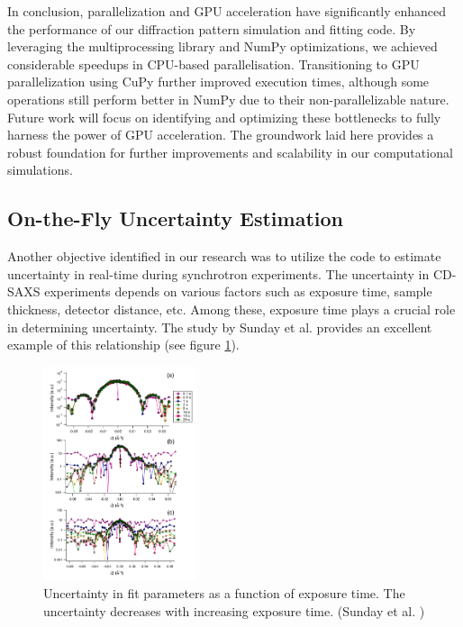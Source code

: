 \medskip

In conclusion, parallelization and GPU acceleration have significantly enhanced the performance
of our diffraction pattern simulation and fitting code. By leveraging the multiprocessing 
library and NumPy optimizations, we achieved considerable speedups in CPU-based parallelisation. 
Transitioning to GPU parallelization using CuPy further improved execution times, although some
operations still perform better in NumPy due to their non-parallelizable nature. Future work 
will focus on identifying and optimizing these bottlenecks to fully harness the power of GPU 
acceleration. The groundwork laid here provides a robust foundation for further improvements 
and scalability in our computational simulations.


\subsection{On-the-Fly Uncertainty Estimation}

Another objective identified in our research was to utilize the code to estimate 
uncertainty in real-time during synchrotron experiments. The uncertainty in CD-SAXS experiments 
depends on various factors such as exposure time, sample thickness, detector distance, etc. Among 
these, exposure time plays a crucial role in determining uncertainty. The study by Sunday et al. \cite{sunday2016evaluation} 
provides an excellent example of this relationship (see figure \ref{fig:exposure}).

\begin{figure}[h]
\centering
\includegraphics[width=0.4\textwidth]{images/exposure.png}
\caption{Uncertainty in fit parameters as a function of exposure time. The uncertainty decreases with increasing exposure time. (Sunday et al. \cite{sunday2016evaluation})}
\label{fig:exposure}
\end{figure}

